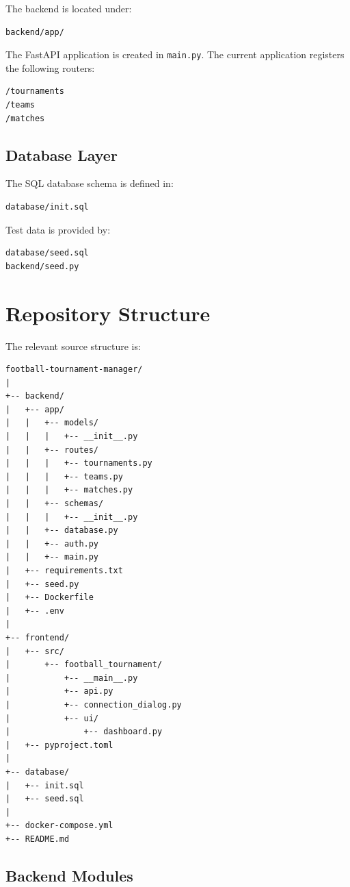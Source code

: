 \documentclass[11pt,a4paper]{article}
\begin{document}
The backend is located under:

\begin{lstlisting}
backend/app/
\end{lstlisting}

The FastAPI application is created in \texttt{main.py}. The current
application registers the following routers:

\begin{lstlisting}
/tournaments
/teams
/matches
\end{lstlisting}

\subsection{Database Layer}

The SQL database schema is defined in:

\begin{lstlisting}
database/init.sql
\end{lstlisting}

Test data is provided by:

\begin{lstlisting}
database/seed.sql
backend/seed.py
\end{lstlisting}

\section{Repository Structure}

The relevant source structure is:

\begin{lstlisting}
football-tournament-manager/
|
+-- backend/
|   +-- app/
|   |   +-- models/
|   |   |   +-- __init__.py
|   |   +-- routes/
|   |   |   +-- tournaments.py
|   |   |   +-- teams.py
|   |   |   +-- matches.py
|   |   +-- schemas/
|   |   |   +-- __init__.py
|   |   +-- database.py
|   |   +-- auth.py
|   |   +-- main.py
|   +-- requirements.txt
|   +-- seed.py
|   +-- Dockerfile
|   +-- .env
|
+-- frontend/
|   +-- src/
|       +-- football_tournament/
|           +-- __main__.py
|           +-- api.py
|           +-- connection_dialog.py
|           +-- ui/
|               +-- dashboard.py
|   +-- pyproject.toml
|
+-- database/
|   +-- init.sql
|   +-- seed.sql
|
+-- docker-compose.yml
+-- README.md
\end{lstlisting}

\subsection{Backend Modules}
\end{document}
